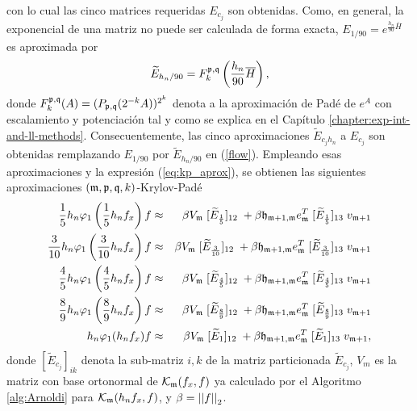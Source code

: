 con lo cual las cinco matrices requeridas $E_{c_j}$ son obtenidas. Como, en general, la exponencial de una matriz no puede ser calculada de forma exacta, $E_{1/90}=e^{\frac{h_n}{90}\overline{H}}$ es aproximada por
\[\widetilde{E}_{h_n/90} = F_k^{\mathfrak{p},\mathfrak{q}}\left(\frac{h_n}{90}\overline{H}\right), \]
donde $F_k^{\mathfrak{p},\mathfrak{q}}(A)=(P_{\mathfrak{p},\mathfrak{q}}(2^{-k}A))^{2^k}$ denota a la aproximación de Padé de $e^A$ con escalamiento y potenciación tal y como se explica en el Capítulo \ref{chapter:exp-int-and-ll-methods}. Consecuentemente, las cinco aproximaciones $\widetilde{E}_{c_jh_n}$ a $E_{c_j}$ son obtenidas remplazando $E_{1/90}$ por $\widetilde{E}_{h_n/90}$ en (\ref{flow}). Empleando esas aproximaciones y la expresión (\ref{eq:kp_aprox}), se obtienen las siguientes aproximaciones $(\mathfrak{m} , \mathfrak{p} ,\mathfrak{q} , k)$-Krylov-Padé
\begin{eqnarray}
    \frac{1}{5}h_n\varphi_1\left(\frac{1}{5}h_n f_x\right)f & \approx & \beta   V_{\mathfrak{m}}\; [\widetilde{E}_{\frac{1}{5}}]_{12}\;  + \beta \mathfrak{h}_{\mathfrak{m}+1,\mathfrak{m}}e_{\mathfrak{m}}^T\; [\widetilde{E}_{\frac{1}{5}}]_{13}\;  v_{\mathfrak{m}+1} \notag \\
    \frac{3}{10}h_n\varphi_1\left(\frac{3}{10}h_n f_x\right)f & \approx & \beta   V_{\mathfrak{m}}\; [\widetilde{E}_{\frac{3}{10}}]_{12}\;  + \beta \mathfrak{h}_{\mathfrak{m}+1,\mathfrak{m}}e_{\mathfrak{m}}^T\; [\widetilde{E}_{\frac{3}{10}}]_{13}\;  v_{\mathfrak{m}+1} \notag \\
    \frac{4}{5}h_n\varphi_1\left(\frac{4}{5}h_n f_x\right)f & \approx & \beta   V_{\mathfrak{m}}\; [\widetilde{E}_{\frac{4}{5}}]_{12}\;  + \beta \mathfrak{h}_{\mathfrak{m}+1,\mathfrak{m}}e_{\mathfrak{m}}^T\; [\widetilde{E}_{\frac{4}{5}}]_{13}\;  v_{\mathfrak{m}+1} \label{phi_appox} \\
    \frac{8}{9}h_n\varphi_1\left(\frac{8}{9}h_n f_x\right)f & \approx & \beta   V_{\mathfrak{m}}\; [\widetilde{E}_{\frac{8}{9}}]_{12}\;  + \beta \mathfrak{h}_{\mathfrak{m}+1,\mathfrak{m}}e_{\mathfrak{m}}^T\; [\widetilde{E}_{\frac{8}{9}}]_{13}\;  v_{\mathfrak{m}+1} \notag \\
    h_n\varphi_1(h_n f_x)f & \approx &  \beta V_{\mathfrak{m}}\; [\widetilde{E}_1]_{12}\;  + \beta\mathfrak{h}_{\mathfrak{m}+1,\mathfrak{m}}e_{\mathfrak{m}}^T\; [\widetilde{E}_1]_{13}\;  v_{\mathfrak{m}+1}, \notag
\end{eqnarray}
donde $[\widetilde{E}_{c_j}]_{ik}$ denota la sub-matriz $i,k$ de la matriz particionada $\widetilde{E}_{c_j}$, $V_m$ es la matriz con base ortonormal de $\mathcal{K}_ {\mathfrak{m}}(f_x,f)$ ya calculado por el Algoritmo \ref{alg:Arnoldi} para $\mathcal{K}_{\mathfrak{m}}(h_nf_x,f)$, y $\beta=\left\lvert \left\lvert f \right\rvert  \right\rvert_2$.

